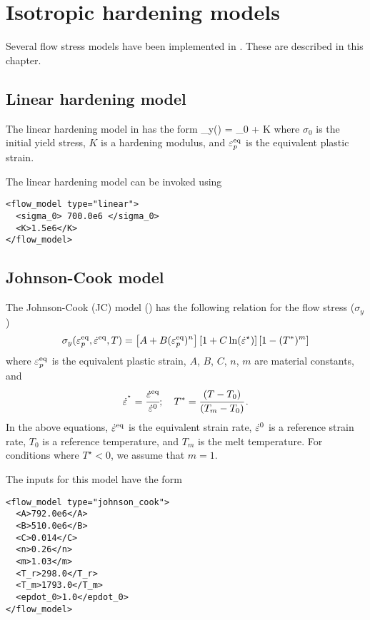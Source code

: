 \chapter{Isotropic hardening models}
Several flow stress models have been implemented in \Vaango.  These are described in this chapter.

\section{Linear hardening model}
The linear hardening model in \Vaango has the form
\Beq
  \sigma_y(\Ep) = \sigma_0 + K \Ep
\Eeq
where $\sigma_0$ is the initial yield stress, $K$ is a hardening modulus, and
$\varepsilon_p^\text{eq}$ is the equivalent plastic strain.

The linear hardening model can be invoked using
\lstset{language=XML}
\begin{lstlisting}
<flow_model type="linear">
  <sigma_0> 700.0e6 </sigma_0>
  <K>1.5e6</K>
</flow_model>
\end{lstlisting}

\section{Johnson-Cook model}
The Johnson-Cook (JC) model (\cite{Johnson1983}) has
the following relation for the flow stress ($\sigma_y$) 
\begin{equation}
  \sigma_y(\varepsilon_p^\text{eq},\dot{\varepsilon}^{\text{eq}},T) = 
  \left[A + B (\varepsilon_p^\text{eq})^n\right]\left[1 + C \ln(\dot{\varepsilon}^{\star})\right]
  \left[1 - (T^*)^m\right]
\end{equation}
where $\varepsilon_p^\text{eq}$ is the equivalent plastic strain, 
$A$, $B$, $C$, $n$, $m$ are material constants, and
\begin{equation}
  \dot{\varepsilon}^{^\star} = \cfrac{\dot{\varepsilon}^{\text{eq}}}{\dot{\varepsilon}^{0}}; \quad
  T^* = \cfrac{(T-T_0)}{(T_m-T_0)}\,.
\end{equation}
In the above equations, $\dot{\varepsilon}^{\text{eq}}$ is the 
equivalent strain rate, 
$\dot{\varepsilon}^{0}$ is a reference strain rate, 
$T_0$ is a reference temperature, and $T_m$ is the melt temperature.  
For conditions where $T^\star < 0$, we assume that $m = 1$.

The inputs for this model have the form
\lstset{language=XML}
\begin{lstlisting}
<flow_model type="johnson_cook">
  <A>792.0e6</A>
  <B>510.0e6</B>
  <C>0.014</C>
  <n>0.26</n>
  <m>1.03</m>
  <T_r>298.0</T_r>
  <T_m>1793.0</T_m>
  <epdot_0>1.0</epdot_0>
</flow_model>
\end{lstlisting}

